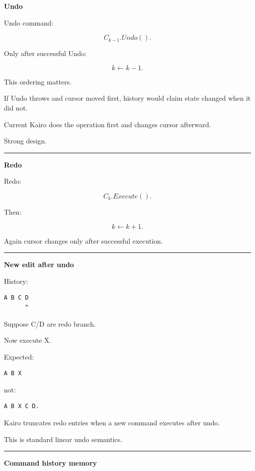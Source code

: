 \textbf{Undo}

Undo command:

\[
C_{k-1}.Undo().
\]

Only after successful Undo:

\[
k\leftarrow k-1.
\]

This ordering matters.

If Undo throws and cursor moved first, history would claim state changed when it did not.

Current Kairo does the operation first and changes cursor afterward.

Strong design.

\begin{center}\rule{0.5\linewidth}{0.5pt}\end{center}

\textbf{Redo}

Redo:

\[
C_k.Execute().
\]

Then:

\[
k\leftarrow k+1.
\]

Again cursor changes only after successful execution.

\begin{center}\rule{0.5\linewidth}{0.5pt}\end{center}

\textbf{New edit after undo}

History:

\begin{verbatim}
A B C D
      ^
\end{verbatim}

Suppose C/D are redo branch.

Now execute X.

Expected:

\begin{verbatim}
A B X
\end{verbatim}

not:

\begin{verbatim}
A B X C D.
\end{verbatim}

Kairo truncates redo entries when a new command executes after undo.

This is standard linear undo semantics.

\begin{center}\rule{0.5\linewidth}{0.5pt}\end{center}

\textbf{Command history memory}

